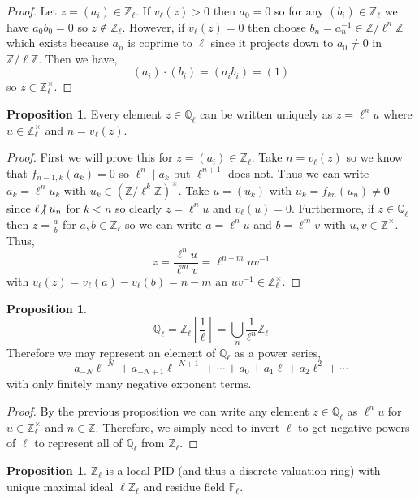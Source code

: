 \documentclass{article}
\newcommand{\divides}{\mid}
\newcommand{\ndivides}{\centernot \mid}
\newcommand{\Z}{\mathbb{Z}}
\newcommand{\Q}{\mathbb{Q}}
\theoremstyle{definition}
\newtheorem{proposition}[theorem]{Proposition}
\newcommand{\finfield}[1]{\mathbb{F}_{#1}}
\begin{document}
\begin{proof}
Let $z = (a_i) \in \Z_\ell$. If $v_{\ell}(z) > 0$ then $a_0 = 0$ so for any $(b_i) \in \Z_{\ell}$ we have $a_0 b_0 = 0$ so $z \notin \Z_{\ell}$. However, if $v_{\ell}(z) = 0$ then choose $b_n = a_n^{-1} \in \Z / \ell^n \Z$ which exists because $a_n$ is coprime to $\ell$ since it projects down to $a_0 \neq 0$ in $\Z / \ell \Z$. Then we have,
\[ (a_i) \cdot (b_i) = (a_i b_i) = (1) \]
so $z \in \Z_{\ell}^\times$.  
\end{proof}

\begin{proposition}
Every element $z \in \Q_{\ell}$ can be written uniquely as $z = \ell^n u$ where $u \in \Z_{\ell}^\times$ and $n = v_{\ell}(z)$. 
\end{proposition}

\begin{proof}
First we will prove this for $z = (a_i) \in \Z_{\ell}$. Take $n = v_{\ell}(z)$ so we know that $f_{n-1, k}(a_{k}) = 0$ so $\ell^n \divides a_k$ but $\ell^{n+1}$ does not. Thus we can write $a_k = \ell^n u_k$ with $u_k \in (\Z / \ell^k \Z)^\times$. Take $u = (u_k)$ with $u_k = f_{k n}(u_n) \neq 0$ since $\ell \ndivides u_n$ for $k < n$ so clearly $z = \ell^n u$ and $v_{\ell}(u) = 0$. Furthermore, if $z \in \Q_{\ell}$ then $z = \frac{a}{b}$ for $a,b \in \Z_{\ell}$ so we can write $a = \ell^n u$ and $b = \ell^m v$ with $u,v \in \Z^\times$. Thus,
\[ z = \frac{\ell^n u}{\ell^m v} = \ell^{n-m} u v^{-1} \]
with $v_{\ell}(z) = v_{\ell}(a) - v_{\ell}(b) = n - m$ an $u v^{-1} \in \Z_{\ell}^\times$.  
\end{proof}

\begin{proposition}
\[ \Q_{\ell} = \Z_{\ell}\left[ \frac{1}{\ell} \right] = \bigcup_n \frac{1}{\ell^n} \Z_{\ell} \]
Therefore we may represent an element of $\Q_{\ell}$ as a power series,
\[ a_{-N} \ell^{-N} + a_{-N + 1} \ell^{-N + 1} + \cdots + a_0 + a_1 \ell + a_2 \ell^2 + \cdots \]
with only finitely many negative exponent terms.
\end{proposition}

\begin{proof}
By the previous proposition we can write any element $z \in \Q_{\ell}$ as $\ell^{n} u$ for $u \in \Z_{\ell}^\times$ and $n \in \Z$. Therefore, we simply need to invert $\ell$ to get negative powers of $\ell$ to represent all of $\Q_{\ell}$ from $\Z_{\ell}$. 
\end{proof}


\begin{proposition}
$\Z_{\ell}$ is a local PID (and thus a discrete valuation ring) with unique maximal ideal $\ell \Z_{\ell}$ and residue field $\finfield{\ell}$. 
\end{proposition}
\end{document}
